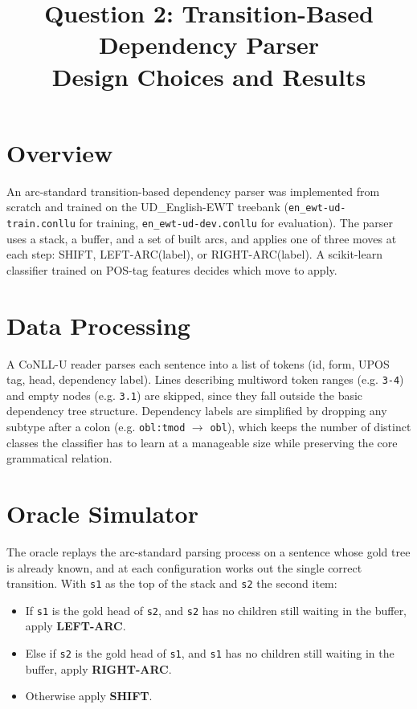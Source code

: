 \documentclass[11pt]{article}
\title{Question 2: Transition-Based Dependency Parser \\ \large Design Choices and Results}
\author{}
\date{}
\begin{document}
\maketitle

\section{Overview}
An arc-standard transition-based dependency parser was implemented from scratch and trained on the UD\_English-EWT treebank (\texttt{en\_ewt-ud-train.conllu} for training, \texttt{en\_ewt-ud-dev.conllu} for evaluation). The parser uses a stack, a buffer, and a set of built arcs, and applies one of three moves at each step: SHIFT, LEFT-ARC(label), or RIGHT-ARC(label). A scikit-learn classifier trained on POS-tag features decides which move to apply.

\section{Data Processing}
A CoNLL-U reader parses each sentence into a list of tokens (id, form, UPOS tag, head, dependency label). Lines describing multiword token ranges (e.g. \texttt{3-4}) and empty nodes (e.g. \texttt{3.1}) are skipped, since they fall outside the basic dependency tree structure. Dependency labels are simplified by dropping any subtype after a colon (e.g. \texttt{obl:tmod} $\to$ \texttt{obl}), which keeps the number of distinct classes the classifier has to learn at a manageable size while preserving the core grammatical relation.

\section{Oracle Simulator}
The oracle replays the arc-standard parsing process on a sentence whose gold tree is already known, and at each configuration works out the single correct transition. With \texttt{s1} as the top of the stack and \texttt{s2} the second item:

\begin{itemize}
  \item If \texttt{s1} is the gold head of \texttt{s2}, and \texttt{s2} has no children still waiting in the buffer, apply \textbf{LEFT-ARC}.
  \item Else if \texttt{s2} is the gold head of \texttt{s1}, and \texttt{s1} has no children still waiting in the buffer, apply \textbf{RIGHT-ARC}.
  \item Otherwise apply \textbf{SHIFT}.
\end{itemize}
\end{document}
